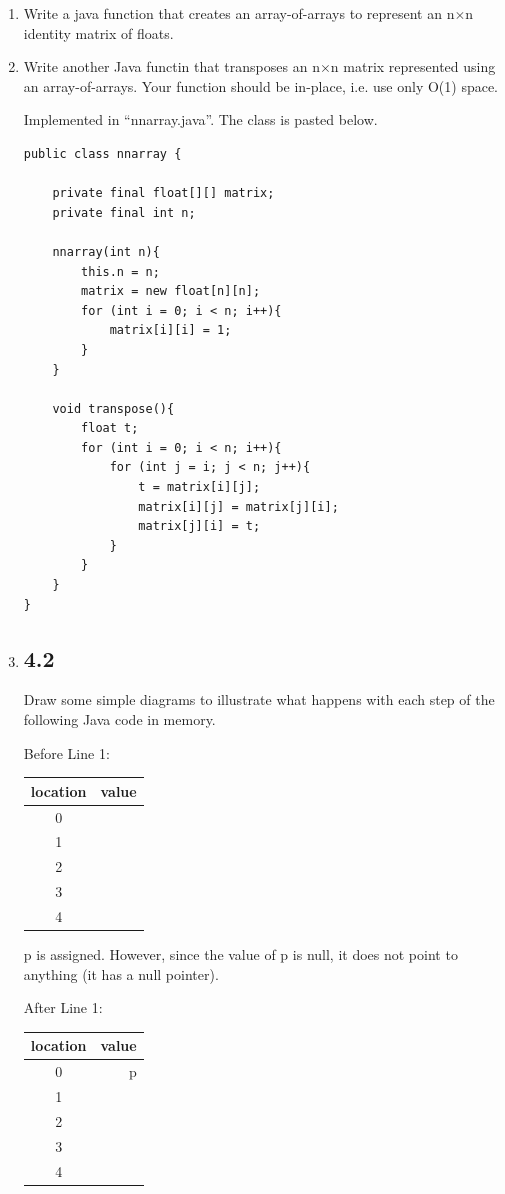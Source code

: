\documentclass[10pt,\jkfside,a4paper]{article}
\begin{document}
\begin{enumerate}

\item Write a java function that creates an array-of-arrays to represent an n$\times$n 
identity matrix of floats.
\item Write another Java functin that transposes an n$\times$n matrix represented 
using an array-of-arrays. Your function should be in-place, i.e. use only O(1) space.

Implemented in ``nnarray.java''. The class is pasted below.

\begin{verbatim}
public class nnarray {

    private final float[][] matrix;
    private final int n;

    nnarray(int n){
        this.n = n;
        matrix = new float[n][n];
        for (int i = 0; i < n; i++){
            matrix[i][i] = 1;
        }
    }

    void transpose(){
        float t;
        for (int i = 0; i < n; i++){
            for (int j = i; j < n; j++){
                t = matrix[i][j];
                matrix[i][j] = matrix[j][i];
                matrix[j][i] = t;
            }
        }
    }
}
\end{verbatim}

\item \subsection*{4.2}
Draw some simple diagrams to illustrate what happens with each step of the following 
Java code in memory.

Before Line 1:
\begin{tabular}{c|r}
location & value\\
\hline
0 & \\
1 & \\
2 & \\
3 & \\
4 & \\
\end{tabular}

p is assigned. However, since the value of p is null, it does not point to 
anything (it has a null pointer).

After Line 1:
\begin{tabular}{c|r}
location & value\\
\hline
0 & p\\
1 & \\
2 & \\
3 & \\
4 & \\
\end{tabular}


\end{enumerate}
\end{document}
